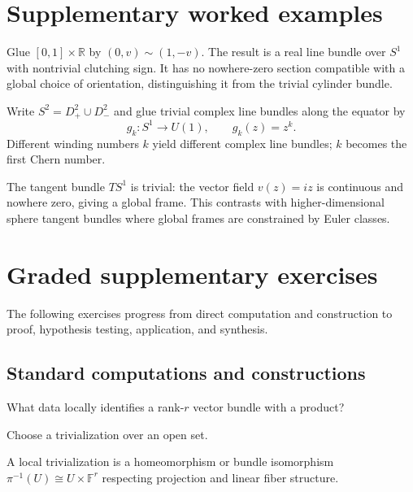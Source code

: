 \section{Supplementary worked examples}
\label{sec:viii30-pedagogy}

\begin{example}\label{ex:viii30-ped-01}
Glue $[0,1]\times\mathbb R$ by $(0,v)\sim(1,-v)$. The result is a real line bundle over $S^1$ with nontrivial clutching sign. It has no nowhere-zero section compatible with a global choice of orientation, distinguishing it from the trivial cylinder bundle.
\end{example}

\begin{example}\label{ex:viii30-ped-02}
Write $S^2=D^2_+\cup D^2_-$ and glue trivial complex line bundles along the equator by
\[
g_k:S^1\to U(1),\qquad g_k(z)=z^k.
\]
Different winding numbers $k$ yield different complex line bundles; $k$ becomes the first Chern number.
\end{example}

\begin{example}\label{ex:viii30-ped-03}
The tangent bundle $TS^1$ is trivial: the vector field $v(z)=iz$ is continuous and nowhere zero, giving a global frame. This contrasts with higher-dimensional sphere tangent bundles where global frames are constrained by Euler classes.
\end{example}

\section{Graded supplementary exercises}
The following exercises progress from direct computation and construction to proof, hypothesis testing, application, and synthesis.

\subsection*{Standard computations and constructions}

\begin{exercise}\label{exr:viii30-ped-01}
What data locally identifies a rank-$r$ vector bundle with a product?
\end{exercise}
\begin{hint}
Choose a trivialization over an open set.
\end{hint}
\begin{solution}
A local trivialization is a homeomorphism or bundle isomorphism $\pi^{-1}(U)\cong U\times\mathbb F^r$ respecting projection and linear fiber structure.
\end{solution}

